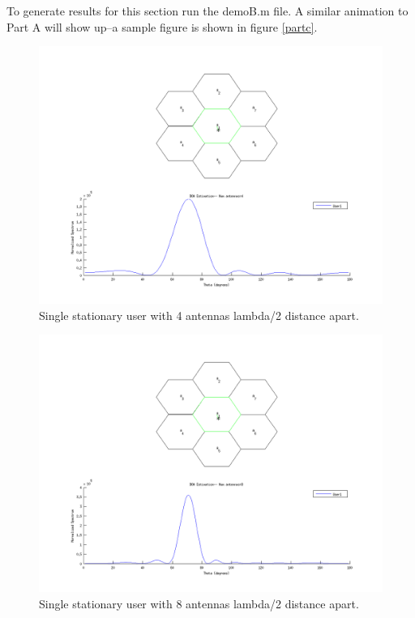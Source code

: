 \documentclass{article}
\begin{document}
To generate results for this section run the demoB.m file. A similar animation to Part A will show up--a sample figure is shown in figure \ref{partc}. \\


\begin{figure}[h]
\centerline{\includegraphics[width=5in]{doc/partC4.png}}
\caption{Single stationary user with 4 antennas lambda/2 distance apart.}
\label{partb1}
\end{figure}

\begin{figure}[h]
\centerline{\includegraphics[width=5in]{doc/partC8.png}}
\caption{Single stationary user with 8 antennas lambda/2 distance apart.}
\label{partb1}
\end{figure}
\end{document}
